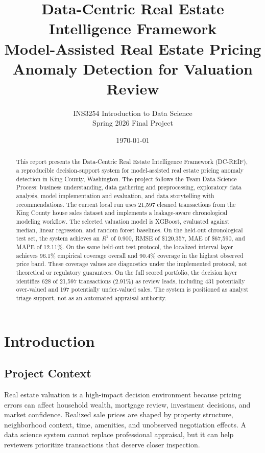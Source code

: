 \documentclass[12pt,a4paper]{article}
\title{\textbf{Data-Centric Real Estate Intelligence Framework}\\
\large Model-Assisted Real Estate Pricing Anomaly Detection for Valuation Review}
\author{INS3254 Introduction to Data Science\\Spring 2026 Final Project}
\date{\today}
\begin{document}
\maketitle

\begin{abstract}
This report presents the Data-Centric Real Estate Intelligence Framework (DC-REIF), a reproducible decision-support system for model-assisted real estate pricing anomaly detection in King County, Washington. The project follows the Team Data Science Process: business understanding, data gathering and preprocessing, exploratory data analysis, model implementation and evaluation, and data storytelling with recommendations. The current local run uses 21,597 cleaned transactions from the King County house sales dataset and implements a leakage-aware chronological modeling workflow. The selected valuation model is XGBoost, evaluated against median, linear regression, and random forest baselines. On the held-out chronological test set, the system achieves an $R^2$ of 0.900, RMSE of \$120,357, MAE of \$67,590, and MAPE of 12.11\%. On the same held-out test protocol, the localized interval layer achieves 96.1\% empirical coverage overall and 90.4\% coverage in the highest observed price band. These coverage values are diagnostics under the implemented protocol, not theoretical or regulatory guarantees. On the full scored portfolio, the decision layer identifies 628 of 21,597 transactions (2.91\%) as review leads, including 431 potentially over-valued and 197 potentially under-valued sales. The system is positioned as analyst triage support, not as an automated appraisal authority.
\end{abstract}

\newpage
\tableofcontents
\listoffigures
\listoftables
\newpage

\section{Introduction}

\subsection{Project Context}
Real estate valuation is a high-impact decision environment because pricing errors can affect household wealth, mortgage review, investment decisions, and market confidence. Realized sale prices are shaped by property structure, neighborhood context, time, amenities, and unobserved negotiation effects. A data science system cannot replace professional appraisal, but it can help reviewers prioritize transactions that deserve closer inspection.
\end{document}
